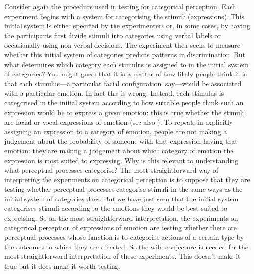 \documentclass[12pt,\papersize]{extarticle}
\begin{document}
Consider again the procedure used in testing for categorical perception.
Each experiment begins with a system for categorising the stimuli (expressions).
This initial system  is either specified by the experimenters or, in some cases, by having the participants first divide stimuli into categories using verbal labels or occasionally using non-verbal decisions.
The experiment then seeks to measure whether this initial system of categories predicts patterns in discrimination.
But what determines  which category each stimulus is assigned to in  the initial system of categories?
You might guess that it is a matter of how likely people think it is that each stimulus---a particular facial configuration, say---would be associated with a particular emotion.
In fact this is wrong.
Instead,
each stimulus is categorised in the initial system according to how suitable people think such an expression would be to express a given emotion: this is true whether the stimuli are facial \citep{horstmann:2002_facial} or vocal \citep{laukka:2011_exploring} expressions of emotion (see also \citealp[pp.\ 98--9]{parkinson:2013_contextualizing}).
To repeat,
in explicitly assigning an expression to a category of emotion, people are not making a judgement about the probability of someone with that expression having that emotion:
they are making a judgement about which category of emotion the expression is most suited to expressing.
Why is this relevant to understanding what perceptual processes categorise?
The most straightforward way of interpreting the experiments on categorical perception is to suppose that they are testing whether perceptual processes categorise stimuli in the same ways as the initial system of categories does.
But we have just seen that the initial system categorises stimuli according to the emotions they would be best suited to expressing.
So on the most straightforward interpretation,
the experiments on categorical perception of expressions of emotion
are testing whether there are perceptual processes whose function is to categorise  actions of a certain type by the outcomes to which they are directed.
So the wild conjecture is needed for the most straightforward interpretation of these experiments.
This doesn't make it true but it does make it worth testing.
\end{document}
